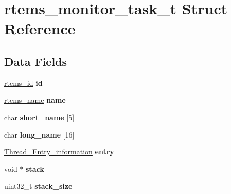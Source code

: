 \hypertarget{structrtems__monitor__task__t}{}\section{rtems\+\_\+monitor\+\_\+task\+\_\+t Struct Reference}
\label{structrtems__monitor__task__t}
\subsection*{Data Fields}
\begin{DoxyCompactItemize}
\item 
\mbox{\label{structrtems__monitor__task__t_a728f13cede2eaff9f9b703663a83a903}} 
\mbox{\hyperlink{group__ClassicTasks_gab20892b814dced7dd4e5b9bf42becd57}{rtems\+\_\+id}} {\bfseries id}
\item 
\mbox{\label{structrtems__monitor__task__t_a451a544f227dd97d36ad912a9322f99e}} 
\mbox{\hyperlink{group__ClassicTasks_ga55fb63c49f68c0cbd9bee004da15b1fd}{rtems\+\_\+name}} {\bfseries name}
\item 
\mbox{\label{structrtems__monitor__task__t_a4b5c213cab70d5552dc2481de3d8ecf2}} 
char {\bfseries short\+\_\+name} \mbox{[}5\mbox{]}
\item 
\mbox{\label{structrtems__monitor__task__t_a34458a97a0d98103838fb8db434ad4c9}} 
char {\bfseries long\+\_\+name} \mbox{[}16\mbox{]}
\item 
\mbox{\label{structrtems__monitor__task__t_ab69e478f2b4e134abd6921a570a895fc}} 
\mbox{\hyperlink{structThread__Entry__information}{Thread\+\_\+\+Entry\+\_\+information}} {\bfseries entry}
\item 
\mbox{\label{structrtems__monitor__task__t_a9508282b1c12e3d74b0edace7ea27569}} 
void $\ast$ {\bfseries stack}
\item 
\mbox{\label{structrtems__monitor__task__t_a0978ffe8006e0a6ee354ec44dda58917}} 
uint32\+\_\+t {\bfseries stack\+\_\+size}
\item 
\mbox{\label{structrtems__monitor__task__t_a8aae44bac6f2c47c0711e9097d4c45e4}} 

\end{DoxyCompactItemize}
